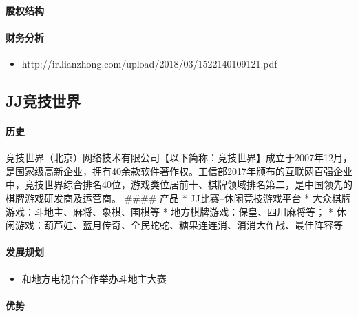 \documentclass[11pt]{article}
\providecommand{\tightlist}{%
      \setlength{\itemsep}{0pt}\setlength{\parskip}{0pt}}
\begin{document}
\hypertarget{ux80a1ux6743ux7ed3ux6784}{%
\paragraph{股权结构}\label{ux80a1ux6743ux7ed3ux6784}}

\hypertarget{ux8d22ux52a1ux5206ux6790}{%
\paragraph{财务分析}\label{ux8d22ux52a1ux5206ux6790}}

\begin{itemize}
\tightlist
\item
  http://ir.lianzhong.com/upload/2018/03/1522140109121.pdf
\end{itemize}

    \hypertarget{jjux7adeux6280ux4e16ux754c}{%
\subsection{JJ竞技世界}\label{jjux7adeux6280ux4e16ux754c}}

\hypertarget{ux5386ux53f2}{%
\paragraph{历史}\label{ux5386ux53f2}}

竞技世界（北京）网络技术有限公司【以下简称：竞技世界】成立于2007年12月，是国家级高新企业，拥有40余款软件著作权。工信部2017年颁布的互联网百强企业中，竞技世界综合排名40位，游戏类位居前十、棋牌领域排名第二，是中国领先的棋牌游戏研发商及运营商。
\#\#\#\# 产品 * JJ比赛--休闲竞技游戏平台 *
大众棋牌游戏：斗地主、麻将、象棋、围棋等 *
地方棋牌游戏：保皇、四川麻将等； *
休闲游戏：葫芦娃、蓝月传奇、全民蛇蛇、糖果连连消、消消大作战、最佳阵容等

\hypertarget{ux53d1ux5c55ux89c4ux5212}{%
\paragraph{发展规划}\label{ux53d1ux5c55ux89c4ux5212}}

\begin{itemize}
\tightlist
\item
  和地方电视台合作举办斗地主大赛
\end{itemize}

\hypertarget{ux4f18ux52bf}{%
\paragraph{优势}\label{ux4f18ux52bf}}
\end{document}
